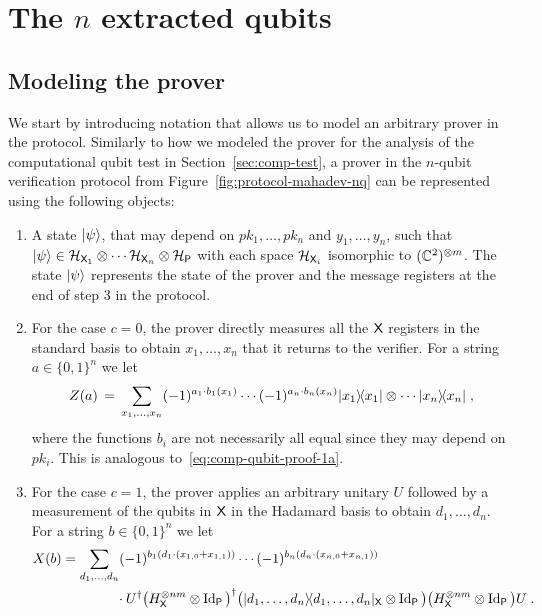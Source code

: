 \section{The $n$ extracted qubits}
\label{sec:extract}

\subsection{Modeling the prover}

We start by introducing notation that allows us to model an arbitrary prover in the protocol. 
Similarly to how we modeled the prover for the analysis of the computational qubit test in Section~\ref{sec:comp-test}, a prover in the $n$-qubit verification protocol from Figure~\ref{fig:protocol-mahadev-nq} can be represented using the following objects:
\begin{enumerate}
\item A state $|\psi\rangle$, that may depend on $pk_1,\ldots,pk_n$ and $y_1,\ldots,y_n$, such that $|\psi\rangle \in \mathcal{H}_{{\textsf{X}}_1} \otimes \cdots \mathcal{H}_{{\textsf{X}}_n} \otimes \mathcal{H}_{{\textsf{P}}}$ with each space $\mathcal{H}_{{\textsf{X}}_i}$ isomorphic to $(\mathbb{C}^2)^{\otimes m}$. The state $|\psi\rangle$ represents the state of the prover and the message registers at the end of step 3 in the protocol. 
\item For the case $c=0$, the prover directly measures all the ${\textsf{X}}$ registers in the standard basis to obtain $x_1,\ldots,x_n$ that it returns to the verifier. For a string $a\in \{0,1\}^n$ we let 
\begin{equation}\label{eq:comp-nqubit-1a}
Z(a) \,=\, \sum_{x_1,\ldots,x_n} (-1)^{a_1 \cdot b_1(x_1)}\cdots (-1)^{a_n \cdot b_n(x_n)} |x_1\rangle\!\langle x_1|\otimes \cdots |x_n\rangle\!\langle x_n|\;,
\end{equation}
where the functions $b_i$ are not necessarily all equal since they may depend on $pk_i$. This is analogous to~\eqref{eq:comp-qubit-proof-1a}.
\item For the case $c=1$, the prover applies an arbitrary unitary $U$ followed by a measurement of the qubits in ${\textsf{X}}$ in the Hadamard basis to obtain $d_1,\ldots,d_n$. For a string $b\in \{0,1\}^n$ we let 
\begin{align}
 X(b)&= \sum_{d_1,\ldots,d_n} (-1)^{b_1 (d_1\cdot(x_{1,0}+x_{1,1}))}\cdots (-1)^{b_n (d_n\cdot(x_{n,0}+x_{n,1}))} \notag\\
&\qquad\qquad \cdot U^\dagger \big(H^{\otimes nm}_{\textsf{X}}\otimes \mathop{\rm Id}\nolimits_{\textsf{P}}\big)^\dagger \big(|d_1,\ldots,d_n\rangle\!\langle d_1,\ldots,d_n|_{\textsf{X}} \otimes \mathop{\rm Id}\nolimits_{\textsf{P}} \big)\big(H^{\otimes nm}_{\textsf{X}}\otimes \mathop{\rm Id}\nolimits_{\textsf{P}}\big) U\;.\label{eq:comp-nqubit-proof-1b}
\end{align}
\end{enumerate}

